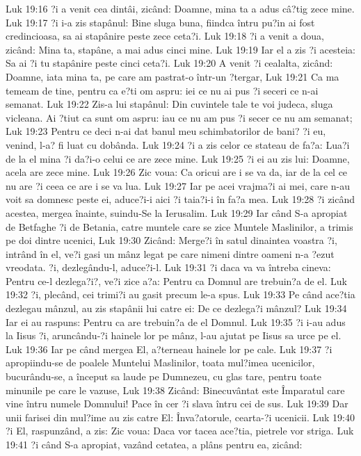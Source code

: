 Luk 19:16  ?i a venit cea dintâi, zicând: Doamne, mina ta a adus câ?tig zece mine.
Luk 19:17  ?i i-a zis stapânul: Bine sluga buna, fiindca întru pu?in ai fost credincioasa, sa ai stapânire peste zece ceta?i.
Luk 19:18  ?i a venit a doua, zicând: Mina ta, stapâne, a mai adus cinci mine.
Luk 19:19  Iar el a zis ?i acesteia: Sa ai ?i tu stapânire peste cinci ceta?i.
Luk 19:20  A venit ?i cealalta, zicând: Doamne, iata mina ta, pe care am pastrat-o într-un ?tergar,
Luk 19:21  Ca ma temeam de tine, pentru ca e?ti om aspru: iei ce nu ai pus ?i seceri ce n-ai semanat.
Luk 19:22  Zis-a lui stapânul: Din cuvintele tale te voi judeca, sluga vicleana. Ai ?tiut ca sunt om aspru: iau ce nu am pus ?i secer ce nu am semanat;
Luk 19:23  Pentru ce deci n-ai dat banul meu schimbatorilor de bani? ?i eu, venind, l-a? fi luat cu dobânda.
Luk 19:24  ?i a zis celor ce stateau de fa?a: Lua?i de la el mina ?i da?i-o celui ce are zece mine.
Luk 19:25  ?i ei au zis lui: Doamne, acela are zece mine.
Luk 19:26  Zic voua: Ca oricui are i se va da, iar de la cel ce nu are ?i ceea ce are i se va lua.
Luk 19:27  Iar pe acei vrajma?i ai mei, care n-au voit sa domnesc peste ei, aduce?i-i aici ?i taia?i-i în fa?a mea.
Luk 19:28  ?i zicând acestea, mergea înainte, suindu-Se la Ierusalim.
Luk 19:29  Iar când S-a apropiat de Betfaghe ?i de Betania, catre muntele care se zice Muntele Maslinilor, a trimis pe doi dintre ucenici,
Luk 19:30  Zicând: Merge?i în satul dinaintea voastra ?i, intrând în el, ve?i gasi un mânz legat pe care nimeni dintre oameni n-a ?ezut vreodata. ?i, dezlegându-l, aduce?i-l.
Luk 19:31  ?i daca va va întreba cineva: Pentru ce-l dezlega?i?, ve?i zice a?a: Pentru ca Domnul are trebuin?a de el.
Luk 19:32  ?i, plecând, cei trimi?i au gasit precum le-a spus.
Luk 19:33  Pe când ace?tia dezlegau mânzul, au zis stapânii lui catre ei: De ce dezlega?i mânzul?
Luk 19:34  Iar ei au raspuns: Pentru ca are trebuin?a de el Domnul.
Luk 19:35  ?i i-au adus la Iisus ?i, aruncându-?i hainele lor pe mânz, l-au ajutat pe Iisus sa urce pe el.
Luk 19:36  Iar pe când mergea El, a?terneau hainele lor pe cale.
Luk 19:37  ?i apropiindu-se de poalele Muntelui Maslinilor, toata mul?imea ucenicilor, bucurându-se, a început sa laude pe Dumnezeu, cu glas tare, pentru toate minunile pe care le vazuse,
Luk 19:38  Zicând: Binecuvântat este Împaratul care vine întru numele Domnului! Pace în cer ?i slava întru cei de sus.
Luk 19:39  Dar unii farisei din mul?ime au zis catre El: Înva?atorule, cearta-?i ucenicii.
Luk 19:40  ?i El, raspunzând, a zis: Zic voua: Daca vor tacea ace?tia, pietrele vor striga.
Luk 19:41  ?i când S-a apropiat, vazând cetatea, a plâns pentru ea, zicând:
